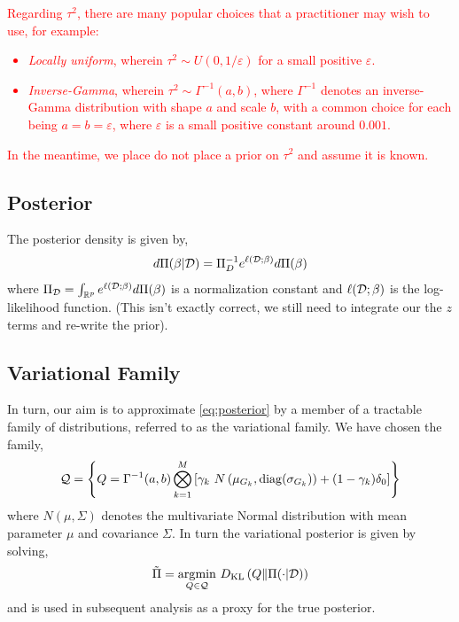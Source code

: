 \documentclass[12pt]{article}
\renewcommand{\red}[1]{\textcolor{red}{#1}}
\begin{document}
\red{
Regarding $\tau^2$, there are many popular choices that a practitioner may wish to use, for example:
\begin{itemize}
    \itemsep0em
    \item \textit{Locally uniform}, wherein $\tau^2 \sim U(0, 1/\varepsilon)$ for a small positive $\varepsilon$.
    \item \textit{Inverse-Gamma}, wherein $\tau^2 \sim \Gamma^{-1}(a, b)$, where $\Gamma^{-1}$ denotes an inverse-Gamma distribution with shape $a$ and scale $b$, with a common choice for each being $a=b=\varepsilon$, where $\varepsilon$ is a small positive constant around $0.001$.
\end{itemize}
In the meantime, we place do not place a prior on $\tau^2$ and assume it is known.
}

\subsection{Posterior}

The posterior density is given by,
\begin{equation} \label{eq:posterior} 
d\Pi(\beta | \mathcal{D}) = \Pi_D^{-1} e^{\ell(\mathcal{D}; \beta)} d\Pi(\beta)
\end{equation}
where $\Pi_{\mathcal{D}} = \int_{\mathbb{R}^{p}} e^{\ell(\mathcal{D}; \beta)} d\Pi(\beta)$ is a normalization constant and $\ell(\mathcal{D}; \beta)$ is the log-likelihood function. (This isn't exactly correct, we still need to integrate our the $z$ terms and re-write the prior).


\subsection{Variational Family}

In turn, our aim is to approximate \eqref{eq:posterior} by a member of a tractable family of distributions, referred to as the variational family. We have chosen the family,
\begin{equation}
    \mathcal{Q} = \left\{ Q = \Gamma^{-1}(a, b) \bigotimes_{k=1}^M \left[ 
    \gamma_k\ N\left(\mu_{G_k}, \operatorname{diag}( \sigma_{G_k}) \right) + (1-\gamma_k) \delta_0
\right] \right\}
\end{equation}
where $N(\mu, \Sigma)$ denotes the multivariate Normal distribution with mean parameter $\mu$ and covariance $\Sigma$. In turn the variational posterior is given by solving,
\begin{equation} \label{eq:optim} 
\tilde{\Pi} = \underset{Q \in \mathcal{Q}}{{\arg\!\min}}\ D_\text{KL}\left( Q \| \Pi(\cdot |\mathcal{D}) \right)
\end{equation}
and is used in subsequent analysis as a proxy for the true posterior.
\end{document}

